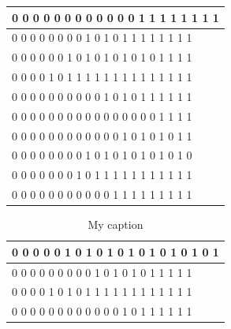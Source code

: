 \documentclass[11pt, a4paper]{article}
\begin{document}
\begin{enumerate}
\begin{table}[http]
\begin{tabular}{|l|}
			0     0     0     0     0     0     0     0     0     0     0     0     1     1     1     1     1     1     1     1 \\ \hline
			0     0     0     0     0     0     0     0     1     0     1     0     1     1     1     1     1     1     1     1 \\ \hline
			0     0     0     0     0     0     1     0     1     0     1     0     1     0     1     0     1     1     1     1 \\ \hline
			0     0     0     0     1     0     1     1     1     1     1     1     1     1     1     1     1     1     1     1 \\ \hline
			0     0     0     0     0     0     0     0     0     0     1     0     1     0     1     1     1     1     1     1 \\ \hline
			0     0     0     0     0     0     0     0     0     0     0     0     0     0     0     0     1     1     1     1 \\ \hline
			0     0     0     0     0     0     0     0     0     0     0     0     1     0     1     0     1     0     1     1 \\ \hline
			0     0     0     0     0     0     0     0     1     0     1     0     1     0     1     0     1     0     1     0 \\ \hline
			0     0     0     0     0     0     0     1     0     1     1     1     1     1     1     1     1     1     1     1 \\ \hline
			0     0     0     0     0     0     0     0     0     0     0     1     1     1     1     1     1     1     1     1 \\ \hline
		\end{tabular}
	\end{table}
	\begin{table}[http]
		\centering
		\caption{My caption}
		\label{my-label}
		\begin{tabular}{|l|}
			\hline
			0     0     0     0     0     1     0     1     0     1     0     1     0     1     0     1     0     1     0     1 \\ \hline
			0     0     0     0     0     0     0     0     0     1     0     1     0     1     0     1     1     1     1     1 \\ \hline
			0     0     0     0     1     0     1     0     1     1     1     1     1     1     1     1     1     1     1     1 \\ \hline
			0     0     0     0     0     0     0     0     0     0     0     0     1     0     1     1     1     1     1     1 \\ \hline

\end{tabular}
\end{table}
\end{enumerate}
\end{document}
